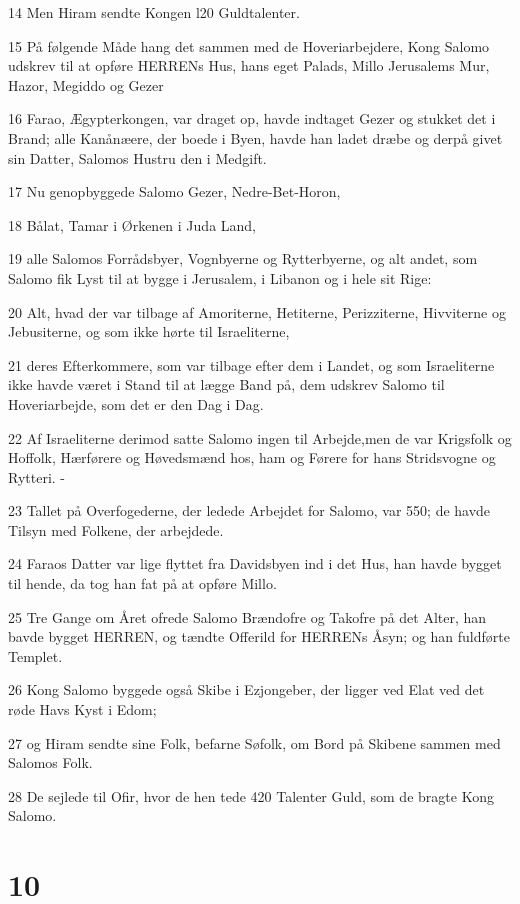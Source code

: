 \par 14 Men Hiram sendte Kongen l20 Guldtalenter.
\par 15 På følgende Måde hang det sammen med de Hoveriarbejdere, Kong Salomo udskrev til at opføre HERRENs Hus, hans eget Palads, Millo Jerusalems Mur, Hazor, Megiddo og Gezer
\par 16 Farao, Ægypterkongen, var draget op, havde indtaget Gezer og stukket det i Brand; alle Kanånæere, der boede i Byen, havde han ladet dræbe og derpå givet sin Datter, Salomos Hustru den i Medgift.
\par 17 Nu genopbyggede Salomo Gezer, Nedre-Bet-Horon,
\par 18 Bålat, Tamar i Ørkenen i Juda Land,
\par 19 alle Salomos Forrådsbyer, Vognbyerne og Rytterbyerne, og alt andet, som Salomo fik Lyst til at bygge i Jerusalem, i Libanon og i hele sit Rige:
\par 20 Alt, hvad der var tilbage af Amoriterne, Hetiterne, Perizziterne, Hivviterne og Jebusiterne, og som ikke hørte til Israeliterne,
\par 21 deres Efterkommere, som var tilbage efter dem i Landet, og som Israeliterne ikke havde været i Stand til at lægge Band på, dem udskrev Salomo til Hoveriarbejde, som det er den Dag i Dag.
\par 22 Af Israeliterne derimod satte Salomo ingen til Arbejde,men de var Krigsfolk og Hoffolk, Hærførere og Høvedsmænd hos, ham og Førere for hans Stridsvogne og Rytteri. -
\par 23 Tallet på Overfogederne, der ledede Arbejdet for Salomo, var 550; de havde Tilsyn med Folkene, der arbejdede.
\par 24 Faraos Datter var lige flyttet fra Davidsbyen ind i det Hus, han havde bygget til hende, da tog han fat på at opføre Millo.
\par 25 Tre Gange om Året ofrede Salomo Brændofre og Takofre på det Alter, han bavde bygget HERREN, og tændte Offerild for HERRENs Åsyn; og han fuldførte Templet.
\par 26 Kong Salomo byggede også Skibe i Ezjongeber, der ligger ved Elat ved det røde Havs Kyst i Edom;
\par 27 og Hiram sendte sine Folk, befarne Søfolk, om Bord på Skibene sammen med Salomos Folk.
\par 28 De sejlede til Ofir, hvor de hen tede 420 Talenter Guld, som de bragte Kong Salomo.

\chapter{10}

